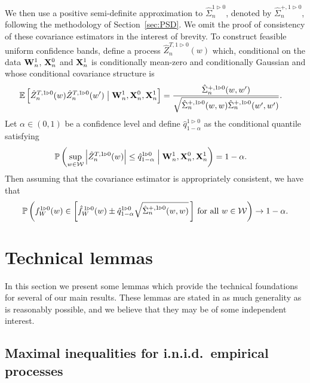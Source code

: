 %
We then use a positive semi-definite approximation to
$\hat\Sigma_n^{1 \triangleright 0}$, denoted by
$\hat\Sigma_n^{+, 1 \triangleright 0}$,
following the methodology of
Section~\ref{sec:PSD}.
We omit the proof of consistency of these covariance estimators
in the interest of brevity.
To construct feasible uniform confidence bands,
define a process $\hat Z_n^{T, 1 \triangleright 0}(w)$ which,
conditional on the data $\mathbf{W}_n^1$, $\mathbf{X}_n^0$ and $\mathbf{X}_n^1$
is conditionally mean-zero and conditionally Gaussian and whose
conditional covariance structure is
%
\begin{align*}
  \mathbb{E}\left[
    \hat Z_n^{T, 1 \triangleright 0}(w)
    \hat Z_n^{T, 1 \triangleright 0}(w')
    \bigm| \mathbf{W}_n^1, \mathbf{X}_n^0, \mathbf{X}_n^1 \right]
  &=
  \frac{\hat \Sigma_n^{+, 1 \triangleright 0}(w,w')}
  {\sqrt{\hat \Sigma_n^{+, 1 \triangleright 0}(w,w)
      \hat \Sigma_n^{+, 1 \triangleright 0}(w',w')}}.
\end{align*}
%
Let $\alpha \in (0,1)$ be a confidence level and define
$\hat q_{1-\alpha}^{1 \triangleright 0}$
as the conditional quantile satisfying
%
\begin{align*}
  \mathbb{P}\left(
    \sup_{w \in \mathcal{W}}
    \left| \hat Z_n^{T, 1 \triangleright 0}(w) \right|
    \leq \hat q_{1-\alpha}^{1 \triangleright 0}
    \Bigm\vert \mathbf{W}_n^1, \mathbf{X}_n^0, \mathbf{X}_n^1
  \right)
  &=
  1 - \alpha.
\end{align*}
%
Then assuming that the covariance estimator is appropriately consistent,
we have that
%
\begin{align*}
  \mathbb{P}\left(
    f_W^{1 \triangleright 0}(w)
    \in
    \left[
      \hat f_W^{\,1 \triangleright 0}(w)
      \pm
      \hat q^{1 \triangleright 0}_{1-\alpha}
      \sqrt{\hat\Sigma_n^{+, 1 \triangleright 0}(w,w)}
      \,\right]
    \,\textup{for all }
    w \in \mathcal{W}
  \right)
  \to 1 - \alpha.
\end{align*}

\section{Technical lemmas}

In this section we present some lemmas which provide the
technical foundations for several of our main results.
These lemmas are stated in as much generality
as is reasonably possible,
and we believe that they may be
of some independent interest.

\subsection{Maximal inequalities for i.n.i.d.\ empirical processes}

